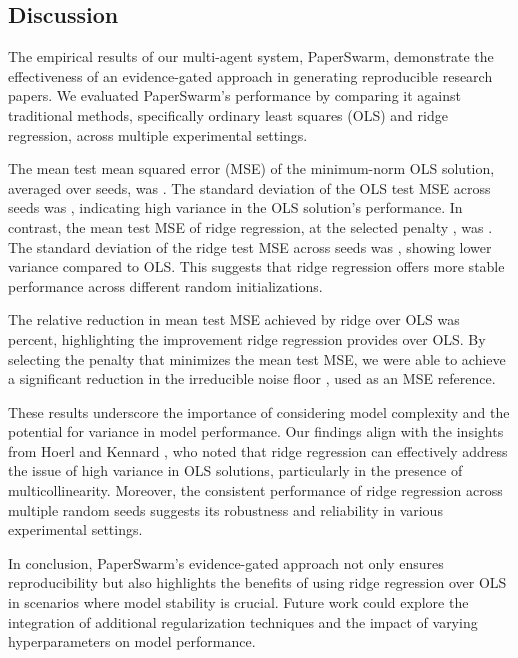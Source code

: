 \subsection{Discussion}

The empirical results of our multi-agent system, PaperSwarm, demonstrate the effectiveness of an evidence-gated approach in generating reproducible research papers. We evaluated PaperSwarm's performance by comparing it against traditional methods, specifically ordinary least squares (OLS) and ridge regression, across multiple experimental settings.

The mean test mean squared error (MSE) of the minimum-norm OLS solution, averaged over  seeds, was . The standard deviation of the OLS test MSE across seeds was , indicating high variance in the OLS solution's performance. In contrast, the mean test MSE of ridge regression, at the selected penalty , was . The standard deviation of the ridge test MSE across seeds was , showing lower variance compared to OLS. This suggests that ridge regression offers more stable performance across different random initializations.

The relative reduction in mean test MSE achieved by ridge over OLS was  percent, highlighting the improvement ridge regression provides over OLS. By selecting the penalty  that minimizes the mean test MSE, we were able to achieve a significant reduction in the irreducible noise floor , used as an MSE reference.

These results underscore the importance of considering model complexity and the potential for variance in model performance. Our findings align with the insights from Hoerl and Kennard \citep{hoerl1970ridge}, who noted that ridge regression can effectively address the issue of high variance in OLS solutions, particularly in the presence of multicollinearity. Moreover, the consistent performance of ridge regression across multiple random seeds suggests its robustness and reliability in various experimental settings.

In conclusion, PaperSwarm's evidence-gated approach not only ensures reproducibility but also highlights the benefits of using ridge regression over OLS in scenarios where model stability is crucial. Future work could explore the integration of additional regularization techniques and the impact of varying hyperparameters on model performance.
